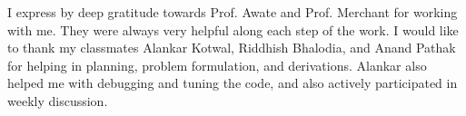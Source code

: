 \acknowledgments

I express by deep gratitude towards Prof. Awate and Prof. Merchant for working with me. They were always very helpful along each step of the work. I would like to thank my classmates Alankar Kotwal, Riddhish Bhalodia, and Anand Pathak for helping in planning, problem formulation, and derivations. Alankar also helped me with debugging and tuning the code, and also actively participated in weekly discussion.






\signature{\today}


